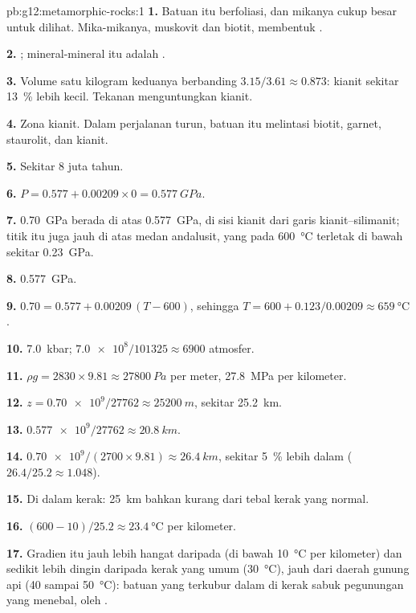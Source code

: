 \begin{solution}{pb:g12:metamorphic-rocks:1}
\textbf{1.} Batuan itu berfoliasi, dan mikanya cukup besar untuk dilihat.
Mika-mikanya, muskovit dan biotit, membentuk .

\textbf{2.} ; mineral-mineral itu adalah .

\textbf{3.} Volume satu kilogram keduanya berbanding $3.15/3.61 \approx
0.873$: kianit sekitar \qty{13}{\percent} lebih kecil. Tekanan menguntungkan
kianit.

\textbf{4.} Zona kianit. Dalam perjalanan turun, batuan itu melintasi 
biotit, garnet, staurolit, dan kianit.

\textbf{5.} Sekitar 8 juta tahun.

\textbf{6.} $P = 0.577 + 0.00209 \times 0 = \qty{0.577}{GPa}$.

\textbf{7.} \qty{0.70}{GPa} berada di atas \qty{0.577}{GPa}, di sisi kianit
dari garis kianit--silimanit; titik itu juga jauh di atas medan andalusit, yang
pada \qty{600}{\celsius} terletak di bawah sekitar \qty{0.23}{GPa}.

\textbf{8.} \qty{0.577}{GPa}.

\textbf{9.} $0.70 = 0.577 + 0.00209\,(T - 600)$, sehingga $T = 600 +
0.123/0.00209 \approx \qty{659}{\celsius}$.

\textbf{10.} \qty{7.0}{kbar}; $\num{7.0e8}/101325 \approx \num{6900}$
atmosfer.

\textbf{11.} $\rho g = 2830 \times 9.81 \approx \qty{27800}{Pa}$ per meter,
\qty{27.8}{MPa} per kilometer.

\textbf{12.} $z = \num{0.70e9}/\num{27762} \approx \qty{25200}{m}$, sekitar
\qty{25.2}{km}.

\textbf{13.} $\num{0.577e9}/\num{27762} \approx \qty{20.8}{km}$.

\textbf{14.} $\num{0.70e9}/(2700 \times 9.81) \approx \qty{26.4}{km}$, sekitar
\qty{5}{\percent} lebih dalam ($26.4/25.2 \approx 1.048$).

\textbf{15.} Di dalam kerak: \qty{25}{km} bahkan kurang dari tebal kerak yang
normal.

\textbf{16.} $(600 - 10)/25.2 \approx \qty{23.4}{\celsius}$ per kilometer.

\textbf{17.} Gradien itu jauh lebih hangat daripada  (di bawah
\qty{10}{\celsius} per kilometer) dan sedikit lebih dingin daripada kerak yang
umum (\qty{30}{\celsius}), jauh dari daerah gunung api (40 sampai
\qty{50}{\celsius}): batuan yang terkubur dalam di kerak sabuk pegunungan yang
menebal, oleh .


\end{solution}
